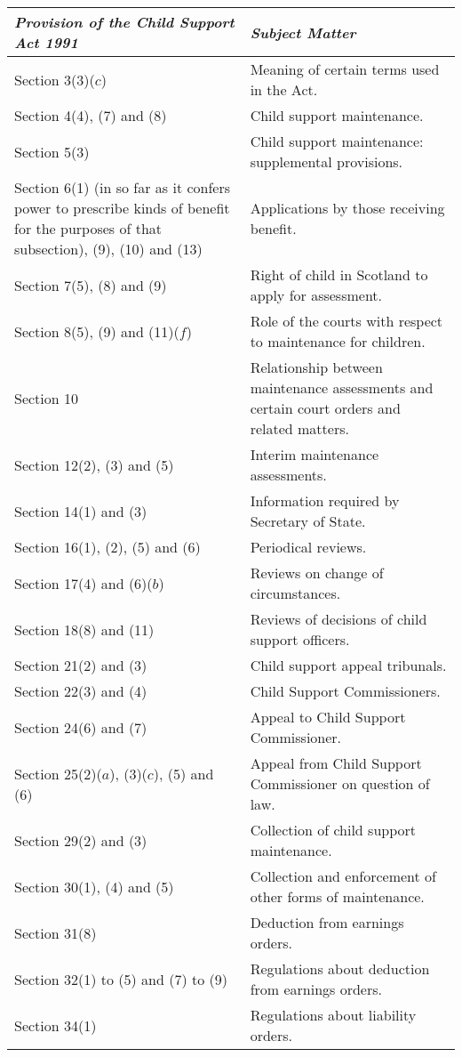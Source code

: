 \documentclass[a4paper]{article}
\begin{document}
\noindent
\begin{longtable}{p{200pt}p{121pt}}
\hline
\itshape Provision of the Child Support Act 1991 & \itshape Subject Matter\\
\hline
\endhead
\hline
\endlastfoot
Section 3(3)($c$)&Meaning of certain terms used in the Act.\\
Section 4(4), (7) and (8)&Child support maintenance.\\
Section 5(3)&Child support maintenance: supplemental provisions.\\
Section 6(1) (in so far as it confers power to prescribe kinds of benefit for the purposes of that subsection), (9), (10) and (13)&Applications by those receiving benefit.\\
Section 7(5), (8) and (9)&Right of child in Scotland to apply for assessment.\\
Section 8(5), (9) and (11)($f$)&Role of the courts with respect to maintenance for children.\\
Section 10&Relationship between maintenance assessments and certain court orders and related matters.\\
Section 12(2), (3) and (5)&Interim maintenance assessments.\\
Section 14(1) and (3)&{Information required by} Secretary of State.\\
Section 16(1), (2), (5) and (6)&Periodical reviews.\\
Section 17(4) and (6)($b$)&Reviews on change of circumstances.\\
Section 18(8) and (11)&{Reviews of decisions of} child support officers.\\
Section 21(2) and (3)&Child support appeal tribunals.\\
Section 22(3) and (4)&Child Support Commissioners.\\
Section 24(6) and (7)&Appeal to Child Support Commissioner.\\
Section 25(2)($a$), (3)($c$), (5) and (6)&Appeal from Child Support Commissioner on question of law.\\
Section 29(2) and (3)&Collection of child support maintenance.\\
Section 30(1), (4) and (5)&Collection and enforcement of other forms of maintenance.\\
Section 31(8)&Deduction from earnings orders.\\
Section 32(1) to (5) and (7) to (9)&Regulations about deduction from earnings orders.\\
Section 34(1)&Regulations about liability orders.\\

\end{longtable}
\end{document}
